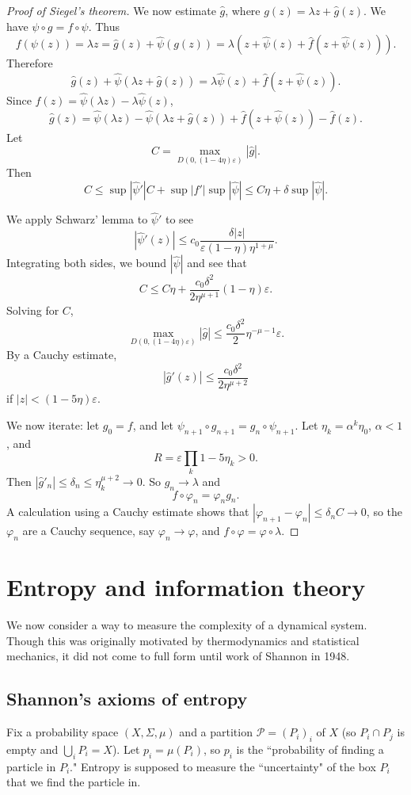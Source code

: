 \documentclass[12pt]{report}
\theoremstyle{definition}
\begin{document}
\begin{proof}[Proof of Siegel's theorem]
We now estimate $\hat g$, where $g(z) = \lambda z + \hat g(z)$. We have $\psi \circ g = f \circ \psi$. Thus
$$f(\psi(z)) = \lambda z = \hat g(z) + \hat \psi(g(z)) = \lambda(z + \hat \psi(z) + \hat f(z + \hat \psi(z))).$$
Therefore
$$\hat g(z) + \hat \psi(\lambda z + \hat g(z)) = \lambda \hat \psi(z) + \hat f(z + \hat \psi(z)).$$
Since $\hat f(z) = \hat \psi(\lambda z) - \lambda \hat \psi(z)$,
$$\hat g(z) = \hat \psi(\lambda z) - \hat \psi(\lambda z + \hat g(z)) + \hat f(z + \hat \psi(z)) - \hat f(z).$$
Let
$$C = \max_{D(0, (1 - 4\eta)\varepsilon)} |\hat g|.$$
Then
$$C \leq \sup |\hat \psi'|C + \sup |f'|\sup|\hat \psi| \leq C\eta + \delta \sup|\hat \psi|.$$

We apply Schwarz' lemma to $\hat \psi'$ to see
$$|\hat \psi'(z)| \leq c_0 \frac{\delta|z|}{\varepsilon(1-\eta)\eta^{1 + \mu}}.$$
Integrating both sides, we bound $|\hat \psi|$ and see that
$$C \leq C\eta + \frac{c_0\delta^2}{2\eta^{\mu + 1}}(1 - \eta)\varepsilon.$$
Solving for $C$,
$$\max_{D(0, (1-4\eta)\varepsilon)} |\hat g| \leq \frac{c_0\delta^2}{2}\eta^{-\mu-1}\varepsilon.$$
By a Cauchy estimate,
$$|\hat g'(z)| \leq \frac{c_0\delta^2}{2\eta^{\mu + 2}}$$
if $|z| < (1 - 5\eta)\varepsilon$.

We now iterate: let $g_0 = f$, and let $\psi_{n+1} \circ g_{n+1} = g_n \circ \psi_{n+1}$. Let $\eta_k = \alpha^k\eta_0$, $\alpha < 1$, and
$$R = \varepsilon \prod_k 1 - 5\eta_k > 0.$$
Then $|\hat g'_n| \leq \delta_n \leq \eta_k^{\mu + 2} \to 0$. So $g_n \to \lambda$ and
$$f \circ \varphi_n = \varphi_n g_n.$$
A calculation using a Cauchy estimate shows that $|\varphi_{n+1} - \varphi_n| \leq \delta_nC \to 0$, so the $\varphi_n$ are a Cauchy sequence, say $\varphi_n \to \varphi$, and $f \circ \varphi = \varphi \circ \lambda$.
\end{proof}

\chapter{Entropy and information theory}
We now consider a way to measure the complexity of a dynamical system. Though this was originally motivated by thermodynamics and statistical mechanics, it did not come to full form until work of Shannon in 1948.

\section{Shannon's axioms of entropy}
Fix a probability space $(X, \Sigma, \mu)$ and a partition $\mathcal P = (P_i)_i$ of $X$ (so $P_i \cap P_j$ is empty and $\bigcup_i P_i = X$). Let $p_i = \mu(P_i)$, so $p_i$ is the ``probability of finding a particle in $P_i$."
Entropy is supposed to measure the ``uncertainty" of the box $P_i$ that we find the particle in.
\end{document}
